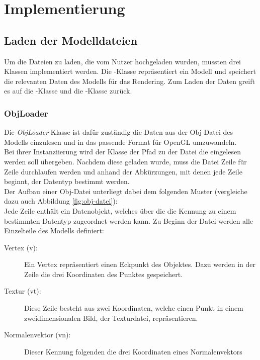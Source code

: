 \chapter{Implementierung}\label{chapter:Implementierung}

\section{Laden der Modelldateien}
Um die Dateien zu laden, die vom Nutzer hochgeladen wurden, mussten drei Klassen implementiert werden. Die \textit{}-Klasse repräsentiert ein Modell und speichert die relevanten Daten des Modells für das Rendering. Zum Laden der Daten greift es auf die \textit{}-Klasse und die \textit{}-Klasse zurück.

\subsection{ObjLoader}\label{sec:objloader}
Die \textit{ObjLoader}-Klasse ist dafür zuständig die Daten aus der Obj-Datei des Modells einzulesen und in das passende Format für OpenGL umzuwandeln.\\
Bei ihrer Instanziierung wird der Klasse der Pfad zu der Datei die eingelesen werden soll übergeben.
Nachdem diese geladen wurde, muss die Datei Zeile für Zeile durchlaufen werden und anhand der Abkürzungen, mit denen jede Zeile beginnt, der Datentyp bestimmt werden. \\
Der Aufbau einer Obj-Datei unterliegt dabei dem folgenden Muster (vergleiche dazu auch Abbildung \ref{fig:obj-datei}):\\
Jede Zeile enthält ein Datenobjekt, welches über die die Kennung zu einem bestimmten Datentyp zugeordnet werden kann. 
Zu Beginn der Datei werden alle Einzelteile des Modells definiert:
\begin{description}
\item[Vertex (v):] Ein Vertex repräsentiert einen Eckpunkt des Objektes. Dazu werden in der Zeile die drei Koordinaten des Punktes gespeichert.
\item[Textur (vt):] Diese Zeile besteht aus zwei Koordinaten, welche einen Punkt in einem zweidimensionalen Bild, der Texturdatei, repräsentieren.
\item[Normalenvektor (vn):] Dieser Kennung folgenden die drei Koordinaten eines Normalenvektors  
\end{description}

